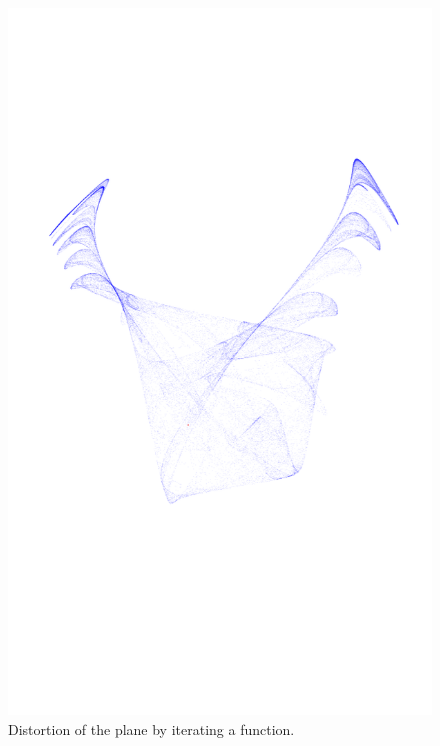 \documentclass[../notebook.tex]{subfiles}
\begin{document}
\begin{figure}[ht]
  \centering
  \includegraphics{../python-notebooks/distort.pdf}
  \caption{Distortion of the plane by iterating a function.}\label{fig:distort}
\end{figure}
\end{document}

